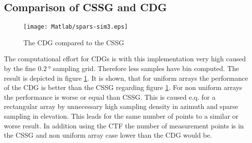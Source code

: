 \subsection{Comparison of CSSG and CDG}

\begin{figure}[h]
\centering
\texttt{[image: Matlab/spars-sim3.eps]}
\caption{The CDG compared to the CSSG}
\label{fig:cdg}
\end{figure}

The computational effort for \acp{CDG} is with this implementation very high caused by the fine $\SI{0.2}{\degree}$ sampling grid. Therefore less samples have bin computed. The result is depicted in figure \ref{fig:cdg}. It is shown, that for uniform arrays the performance of the \ac{CDG} is better than the \ac{CSSG} regarding figure \ref{fig:cdg}. For non uniform arrays the performance is worse or equal than \ac{CSSG}. This is caused e.q. for a rectangular array by unnecessary high sampling density in azimuth and sparse sampling in elevation. This leads for the same number of points to a similar or worse result. In addition using the \ac{CTF} the number of measurement points is in the \ac{CSSG} and non uniform array case lower than the \ac{CDG} would be.



